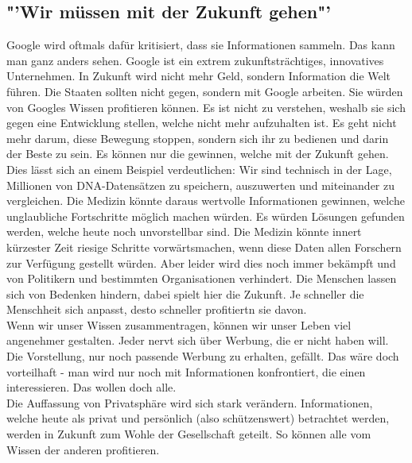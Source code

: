 \subsection*{"'Wir müssen mit der Zukunft gehen"'}
Google wird oftmals dafür kritisiert, dass sie Informationen sammeln. 
Das kann man ganz anders sehen. Google ist ein extrem zukunftsträchtiges, 
innovatives Unternehmen. In Zukunft wird nicht mehr Geld, sondern 
Information die Welt führen. Die Staaten sollten nicht gegen, sondern 
mit Google arbeiten. Sie würden von Googles Wissen profitieren können.
Es ist nicht zu verstehen, weshalb sie sich gegen eine Entwicklung stellen, welche 
nicht mehr aufzuhalten ist. Es geht nicht mehr darum, diese Bewegung 
stoppen, sondern sich ihr zu bedienen und darin der Beste zu sein. Es 
können nur die gewinnen, welche mit der Zukunft gehen.\\
Dies l\"asst sich an einem Beispiel verdeutlichen: Wir sind technisch in 
der Lage, Millionen von DNA-Datensätzen zu speichern, auszuwerten und 
miteinander zu vergleichen. Die Medizin könnte daraus wertvolle 
Informationen gewinnen, welche unglaubliche Fortschritte möglich machen 
würden. Es würden Lösungen gefunden werden, welche heute noch unvorstellbar 
sind. Die Medizin könnte innert kürzester Zeit riesige Schritte 
vorwärtsmachen, wenn diese Daten allen Forschern zur Verfügung gestellt 
würden. Aber leider wird dies noch immer bekämpft und von Politikern 
und bestimmten Organisationen verhindert. Die Menschen lassen sich von Bedenken 
hindern, dabei spielt hier die Zukunft. Je schneller die Menschheit sich anpasst, 
desto schneller profitiertn sie davon.\\
Wenn wir unser Wissen zusammentragen, können wir unser Leben viel 
angenehmer gestalten. Jeder nervt sich über Werbung, die er nicht haben 
will. Die Vorstellung, nur noch passende 
Werbung zu erhalten, gef\"allt. Das wäre doch vorteilhaft - man wird nur noch mit 
Informationen konfrontiert, die einen interessieren. Das wollen doch 
alle.\\
Die Auffassung von Privatsphäre wird sich stark 
verändern. Informationen, welche heute als privat und persönlich 
(also schützenswert) betrachtet werden, werden in Zukunft zum Wohle der 
Gesellschaft geteilt. So können alle vom Wissen der anderen profitieren.

